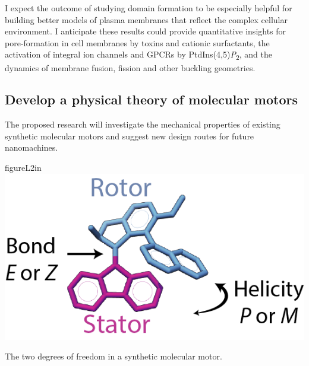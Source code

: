 \documentclass[11pt,notitlepage]{article}
\begin{document}
I expect the outcome of studying domain formation to be especially
helpful for building better models of plasma membranes that reflect the
complex cellular environment. I anticipate these results could provide
quantitative insights for pore-formation in cell membranes by toxins and
cationic surfactants, the activation of integral ion channels and GPCRs
by PtdIns(4,5)\emph{P}\textsubscript{2}, and the dynamics of membrane
fusion, fission and other buckling geometries.

\hypertarget{develop-a-physical-theory-of-molecular-motors}{%
\subsection{Develop a physical theory of molecular
motors}\label{develop-a-physical-theory-of-molecular-motors}}

{The proposed research will investigate the mechanical properties of
existing synthetic molecular motors and suggest new design routes for
future nanomachines.}


\begin{wrapfloat}{figure}{L}{2in}
\centering
\includegraphics{content/images/motor.png}
\caption{The two degrees of freedom in a synthetic molecular motor.}
\label{fig:motor-diagram}
\end{wrapfloat}
\end{document}
